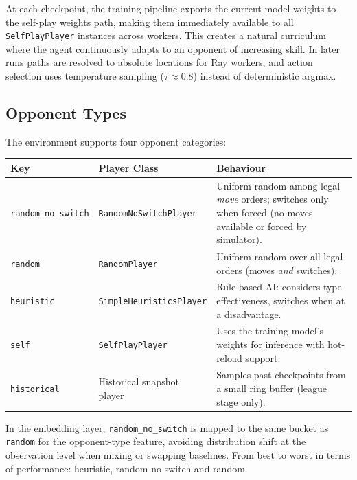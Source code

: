 At each checkpoint, the training pipeline exports the current model weights to
the self-play weights path, making them immediately available to all
\texttt{SelfPlayPlayer} instances across workers.  This creates a natural
curriculum where the agent continuously adapts to an opponent of increasing
skill. In later runs paths are resolved to absolute locations for Ray workers, and
action selection uses temperature sampling ($\tau \approx 0.8$) instead of deterministic argmax.


\subsection{Opponent Types}

The environment supports four opponent categories:

\begin{center}
\small
\begin{tabularx}{\textwidth}{l l X}
  \toprule
  \textbf{Key} & \textbf{Player Class} & \textbf{Behaviour} \\
  \midrule
  \texttt{random\_no\_switch} & \texttt{RandomNoSwitchPlayer} &
    Uniform random among legal \emph{move} orders; switches only when forced
    (no moves available or forced by simulator). \\
  \texttt{random} & \texttt{RandomPlayer} &
    Uniform random over all legal orders (moves \emph{and} switches). \\
  \texttt{heuristic} & \texttt{SimpleHeuristicsPlayer} &
    Rule-based AI: considers type effectiveness, switches when at a
    disadvantage. \\
  \texttt{self} & \texttt{SelfPlayPlayer} &
    Uses the training model's weights for inference with hot-reload support. \\
    \texttt{historical} & Historical snapshot player &
    Samples past checkpoints from a small ring buffer (league stage only). \\
  \bottomrule
\end{tabularx}
\end{center}

In the embedding layer, \texttt{random\_no\_switch} is mapped to the same
bucket as \texttt{random} for the opponent-type feature, avoiding distribution
shift at the observation level when mixing or swapping baselines. From best to worst in terms of performance: heuristic, random no switch and random.

